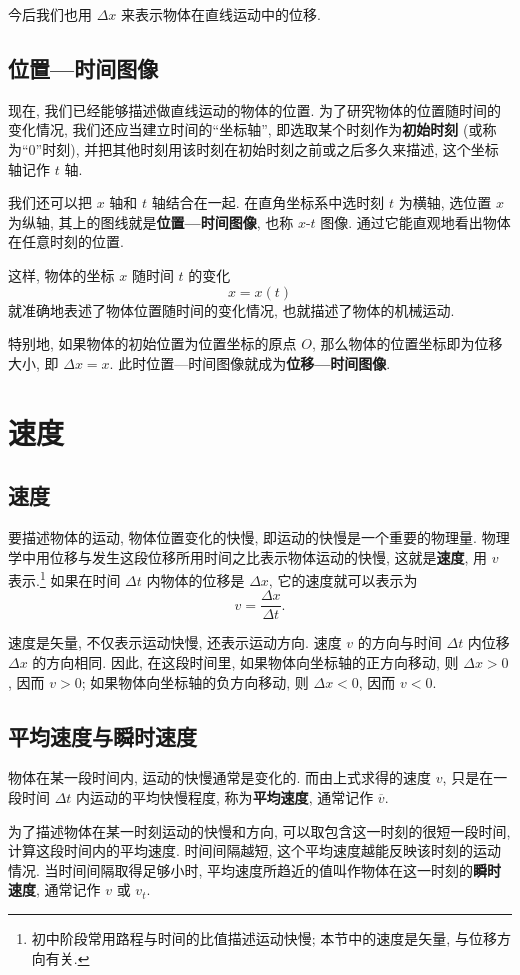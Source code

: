 \documentclass[UTF8,openany,fontset=fandol]{ctexbook}
\theoremstyle{chinesetextbook}
\begin{document}
今后我们也用 $\Delta x$ 来表示物体在直线运动中的位移.
\subsection{位置—时间图像}
现在, 我们已经能够描述做直线运动的物体的位置. 为了研究物体的位置随时间的变化情况, 我们还应当建立时间的“坐标轴”, 即选取某个时刻作为\textbf{初始时刻} (或称为“0”时刻), 并把其他时刻用该时刻在初始时刻之前或之后多久来描述, 这个坐标轴记作 $t$ 轴.

我们还可以把 $x$ 轴和 $t$ 轴结合在一起. 在直角坐标系中选时刻 $t$ 为横轴, 选位置 $x$ 为纵轴, 其上的图线就是\textbf{位置—时间图像}, 也称 $x$-$t$ 图像. 通过它能直观地看出物体在任意时刻的位置.

这样, 物体的坐标 $x$ 随时间 $t$ 的变化
\[
x=x(t)
\]
就准确地表述了物体位置随时间的变化情况, 也就描述了物体的机械运动.

特别地, 如果物体的初始位置为位置坐标的原点 $O$, 那么物体的位置坐标即为位移大小, 即 $\Delta x=x$. 此时位置—时间图像就成为\textbf{位移—时间图像}.
\section{速度}\label{sec:速度节}
\subsection{速度}
要描述物体的运动, 物体位置变化的快慢, 即运动的快慢是一个重要的物理量. 物理学中用位移与发生这段位移所用时间之比表示物体运动的快慢, 这就是\textbf{速度}, 用 $v$ 表示.\footnote{初中阶段常用路程与时间的比值描述运动快慢; 本节中的速度是矢量, 与位移方向有关.} 如果在时间 $\Delta t$ 内物体的位移是 $\Delta x$, 它的速度就可以表示为
\[
v=\frac{\Delta x}{\Delta t}.
\]

速度是矢量, 不仅表示运动快慢, 还表示运动方向. 速度 $v$ 的方向与时间 $\Delta t$ 内位移 $\Delta x$ 的方向相同. 因此, 在这段时间里, 如果物体向坐标轴的正方向移动, 则 $\Delta x>0$, 因而 $v>0$; 如果物体向坐标轴的负方向移动, 则 $\Delta x<0$, 因而 $v<0$.
\subsection{平均速度与瞬时速度}
物体在某一段时间内, 运动的快慢通常是变化的. 而由上式求得的速度 $v$, 只是在一段时间 $\Delta t$ 内运动的平均快慢程度, 称为\textbf{平均速度}, 通常记作 $\overline{v}$.

为了描述物体在某一时刻运动的快慢和方向, 可以取包含这一时刻的很短一段时间, 计算这段时间内的平均速度. 时间间隔越短, 这个平均速度越能反映该时刻的运动情况. 当时间间隔取得足够小时, 平均速度所趋近的值叫作物体在这一时刻的\textbf{瞬时速度}, 通常记作 $v$ 或 $v_t$.
\end{document}
